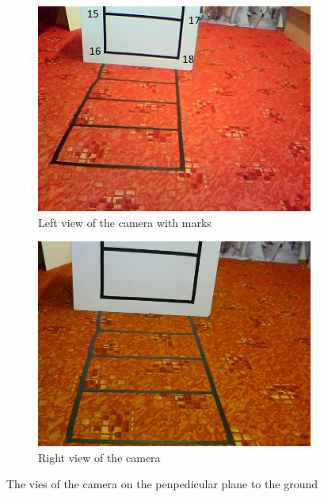 \begin{figure}
\centering
\begin{subfigure}{0.48\linewidth}
	\includegraphics[width=\linewidth]{img/experiments/table-left.jpg}
	\caption{Left view of the camera with marks}
	\label{fig:tablenumbered}
\end{subfigure}
\begin{subfigure}{0.48\linewidth}
	\includegraphics[width=\linewidth]{img/experiments/table-right.jpg}
	\caption{Right view of the camera}
\end{subfigure}
\caption{The vies of the camera on the penpedicular plane to the ground}
\label{fig:table}
\end{figure}

